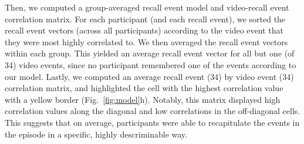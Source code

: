 \documentclass{article}
\begin{document}
{Then, we computed a group-averaged recall event model and video-recall event correlation matrix. For each participant (and each recall event), we sorted the recall event vectors (across all participants) according to the video event that they were most highly correlated to. We then averaged the recall event vectors within each group. This yielded an average recall event vector for all but one (of 34) video events, since no participant remembered one of the events according to our model. Lastly, we computed an average recall event (34) by video event (34) correlation matrix, and highlighted the cell with the highest correlation value with a yellow border (Fig.~\ref{fig:model}h). Notably, this matrix displayed high correlation values along the diagonal and low correlations in the off-diagonal cells. This suggests that on average, participants were able to recapitulate the events in the episode in a specific, highly descriminable way.

}
\end{document}
